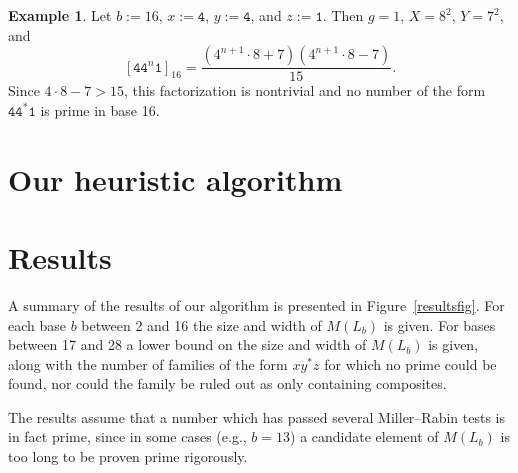 \documentclass[12pt]{article}
\theoremstyle{plain}
\theoremstyle{definition}
\newtheorem{example}[theorem]{Example}
\theoremstyle{remark}
\newcommand{\0}{\mathtt{0}}
\newcommand{\1}{\mathtt{1}}
\newcommand{\2}{\mathtt{2}}
\newcommand{\3}{\mathtt{3}}
\newcommand{\4}{\mathtt{4}}
\newcommand{\5}{\mathtt{5}}
\newcommand{\6}{\mathtt{6}}
\newcommand{\7}{\mathtt{7}}
\newcommand{\8}{\mathtt{8}}
\newcommand{\9}{\mathtt{9}}
\begin{document}
\begin{example}
Let $b:=16$, $x:=\4$, $y:=\4$, and $z:=\1$.  Then $g=1$, $X=8^2$, $Y=7^2$, and
\[ [\4\4^n\1]_{16} = \frac{(4^{n+1}\cdot8+7)(4^{n+1}\cdot8-7)}{15} . \]
Since $4\cdot8-7>15$, this factorization is nontrivial and no number of 
the form $\4\4^*\1$ is prime in base 16.
\end{example}

\section{Our heuristic algorithm}

\section{Results}
A summary of the results of our algorithm is presented in Figure~\ref{resultsfig}.
For each base $b$ between 2 and 16 the size and width of $M(L_b)$ is given.
For bases between 17 and 28 a lower bound on the size and width of $M(L_b)$ is given,
along with the number of families of the form $xy^*z$ for which no prime could be found,
nor could the family be ruled out as only containing composites.

The results assume that a number which has passed several Miller--Rabin
tests is in fact prime, since in some cases (e.g., $b=13$) a candidate element of $M(L_b)$
is too long to be proven prime rigorously.
\end{document}
